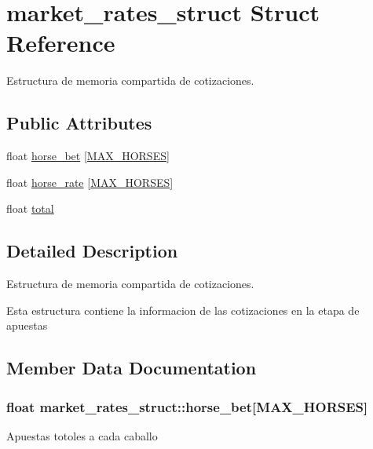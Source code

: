 \hypertarget{structmarket__rates__struct}{}\section{market\+\_\+rates\+\_\+struct Struct Reference}
\label{structmarket__rates__struct}


Estructura de memoria compartida de cotizaciones.  


\subsection*{Public Attributes}
\begin{DoxyCompactItemize}
\item 
float \hyperlink{structmarket__rates__struct_a364e28430ed23ff65270f5124d94f932}{horse\+\_\+bet} \mbox{[}\hyperlink{proyecto_8c_a1f292d5e7fb89ea56519859a22db34c6}{M\+A\+X\+\_\+\+H\+O\+R\+S\+ES}\mbox{]}
\item 
float \hyperlink{structmarket__rates__struct_ad3c6f2f118a4c411a8035256851d141a}{horse\+\_\+rate} \mbox{[}\hyperlink{proyecto_8c_a1f292d5e7fb89ea56519859a22db34c6}{M\+A\+X\+\_\+\+H\+O\+R\+S\+ES}\mbox{]}
\item 
float \hyperlink{structmarket__rates__struct_afabd309263178532df483c3f56acb586}{total}
\end{DoxyCompactItemize}


\subsection{Detailed Description}
Estructura de memoria compartida de cotizaciones. 

Esta estructura contiene la informacion de las cotizaciones en la etapa de apuestas 

\subsection{Member Data Documentation}
\subsubsection[{\texorpdfstring{horse\+\_\+bet}{horse_bet}}]{\setlength{\rightskip}{0pt plus 5cm}float market\+\_\+rates\+\_\+struct\+::horse\+\_\+bet\mbox{[}{\bf M\+A\+X\+\_\+\+H\+O\+R\+S\+ES}\mbox{]}}\hypertarget{structmarket__rates__struct_a364e28430ed23ff65270f5124d94f932}{}\label{structmarket__rates__struct_a364e28430ed23ff65270f5124d94f932}
Apuestas totoles a cada caballo 
